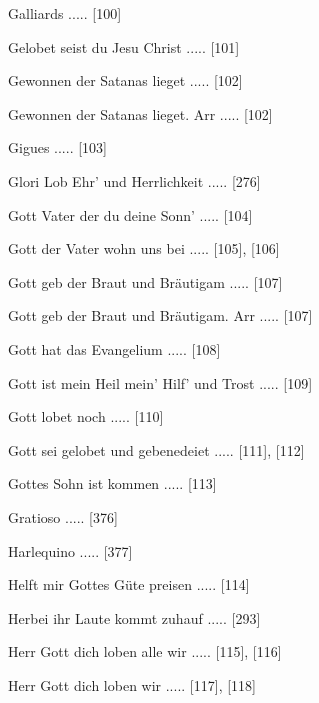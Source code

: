 \documentclass[twocolumn, 12pt]{book}
\begin{document}
\newline 
Galliards ..... [100]

\newline 
Gelobet seist du Jesu Christ ..... [101]

\newline 
Gewonnen der Satanas lieget ..... [102]

\newline 
Gewonnen der Satanas lieget. Arr ..... [102]

\newline 
Gigues ..... [103]

\newline 
Glori Lob Ehr' und Herrlichkeit ..... [276]

\newline 
Gott Vater der du deine Sonn' ..... [104]

\newline 
Gott der Vater wohn uns bei ..... [105], [106]

\newline 
Gott geb der Braut und Bräutigam ..... [107]

\newline 
Gott geb der Braut und Bräutigam. Arr ..... [107]

\newline 
Gott hat das Evangelium ..... [108]

\newline 
Gott ist mein Heil mein' Hilf' und Trost ..... [109]

\newline 
Gott lobet noch ..... [110]

\newline 
Gott sei gelobet und gebenedeiet ..... [111], [112]

\newline 
Gottes Sohn ist kommen ..... [113]

\newline 
Gratioso ..... [376]

\newline 
Harlequino ..... [377]

\newline 
Helft mir Gottes Güte preisen ..... [114]

\newline 
Herbei ihr Laute kommt zuhauf ..... [293]

\newline 
Herr Gott dich loben alle wir ..... [115], [116]

\newline 
Herr Gott dich loben wir ..... [117], [118]
\end{document}
